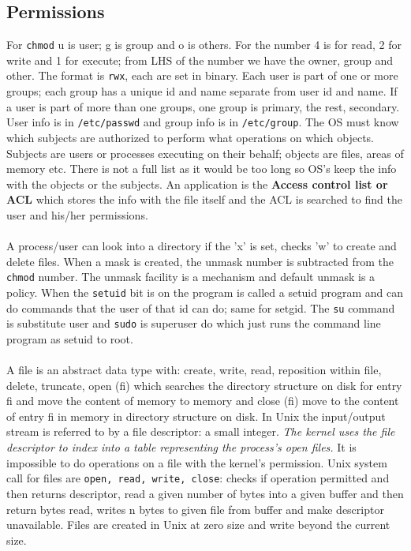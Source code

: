 \documentclass[twoside]{article}
\begin{document}
\subsection{Permissions}
For \texttt{chmod} u is user; g is group and o is others. For the number 4 is for read, 2 for write and 1 for execute; from LHS of the number we have the owner, group and other. The format is \texttt{rwx}, each are set in binary. Each user is part of one or more groups; each group has a unique id and name separate from user id and name. If a user is part of more than one groups, one group is primary, the rest, secondary. User info is in \texttt{/etc/passwd} and group info is in \texttt{/etc/group}. The OS must know which subjects are authorized to perform what operations on which objects. Subjects are users or processes executing on their behalf; objects are files, areas of memory etc. There is not a full list as it would be too long so OS's keep the info with the objects or the subjects. An application is the \textbf{Access control list or ACL} which stores the info with the file itself and the ACL is searched to find the user and his/her permissions.\\ \\
A process/user can look into a directory if the 'x' is set, checks 'w' to create and delete files. When a mask is created, the unmask number is subtracted from the \texttt{chmod} number. The unmask facility is  a mechanism and default unmask is a policy. When the \texttt{setuid} bit is on the program is called a setuid program and can do commands that the user of that id can do; same for setgid. The \texttt{su} command is substitute user and \texttt{sudo} is superuser do which just runs the command line program as setuid to root.\\ \\
A file is an abstract data type with: create, write, read, reposition within file, delete, truncate, open (fi) which searches the directory structure on disk for entry fi and move the content of memory to memory and close (fi) move to the content of entry fi in memory in directory structure on disk. In Unix the input/output stream is referred to by a file descriptor: a small integer. \emph{The kernel uses the file descriptor to index into a table representing the process's open files.} It is impossible to do operations on a file with the kernel's permission. Unix system call for files are \texttt{open, read, write, close}: checks if operation permitted and then returns descriptor, read a given number of bytes into a given buffer and then return bytes read, writes n bytes to given file from buffer and make descriptor unavailable. Files are created in Unix at zero size and write beyond the current size.\\ \\
\end{document}
